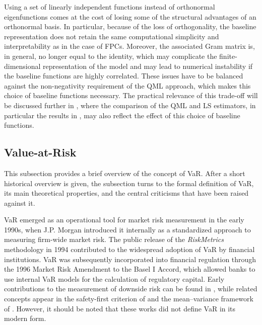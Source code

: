 \documentclass[12pt,a4paper]{article}
\theoremstyle{definition}
\begin{document}
Using a set of linearly independent functions instead of orthonormal eigenfunctions comes at the cost of losing some of the structural advantages of an orthonormal basis. In particular, because of the loss of orthogonality, the baseline representation does not retain the same computational simplicity and interpretability as in the case of FPCs. Moreover, the associated Gram matrix is, in general, no longer equal to the identity, which may complicate the finite-dimensional representation of the model and may lead to numerical instability if the baseline functions are highly correlated. These issues have to be balanced against the non-negativity requirement of the QML approach, which makes this choice of baseline functions necessary. The practical relevance of this trade-off will be discussed further in , where the comparison of the QML and LS estimators, in particular the results in , may also reflect the effect of this choice of baseline functions.
\subsection{Value-at-Risk}
\label{subsec:ValueAtRisk}
This subsection provides a brief overview of the concept of VaR. After a short historical overview is given, the subsection turns to the formal definition of VaR, its main theoretical properties, and the central criticisms that have been raised against it.

VaR emerged as an operational tool for market risk measurement in the early 1990s, when J.P. Morgan introduced it internally as a standardized approach to measuring firm-wide market risk. The public release of the \textit{RiskMetrics} methodology in 1994 contributed to the widespread adoption of VaR by financial institutions. VaR was subsequently incorporated into financial regulation through the 1996 Market Risk Amendment to the Basel I Accord, which allowed banks to use internal VaR models for the calculation of regulatory capital. Early contributions to the measurement of downside risk can be found in \citet{Leavens1945}, while related concepts appear in the safety-first criterion of \citet{Roy1952} and the mean--variance framework of \citet{Markowitz1952}. However, it should be noted that these works did not define VaR in its modern form.
\end{document}
